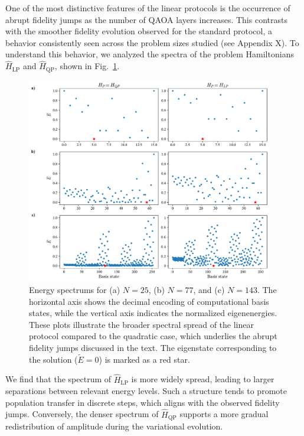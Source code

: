 One of the most distinctive features of the linear protocols is the occurrence of abrupt fidelity jumps as the number of QAOA layers increases. This contrasts with the smoother fidelity evolution observed for the standard protocol, a behavior consistently seen across the problem sizes studied (see Appendix X). To understand this behavior, we analyzed the spectra of the problem Hamiltonians $\hat{H}_\mathrm{LP}$ and $\hat{H}_\mathrm{QP}$, shown in Fig.~\ref{fig:spectrums}.
\begin{figure}[h]
    \centering
    \includegraphics[width=0.96\textwidth]{05-discussion/figs/energy_spectrums.pdf}
    \caption{Energy spectrums for (a) $N=25$, (b) $N=77$, and (c) $N=143$. The horizontal axis shows the decimal encoding of computational basis states, while the vertical axis indicates the normalized eigenenergies. These plots illustrate the broader spectral spread of the linear protocol compared to the quadratic case, which underlies the abrupt fidelity jumps discussed in the text. The eigenstate corresponding to the solution ($\widetilde{E}=0$) is marked as a red star.}
    \label{fig:spectrums}
\end{figure}
We find that the spectrum of $\hat{H}_\mathrm{LP}$ is more widely spread, leading to larger separations between relevant energy levels. Such a structure tends to promote population transfer in discrete steps, which aligns with the observed fidelity jumps. Conversely, the denser spectrum of $\hat{H}_\mathrm{QP}$ supports a more gradual redistribution of amplitude during the variational evolution.

